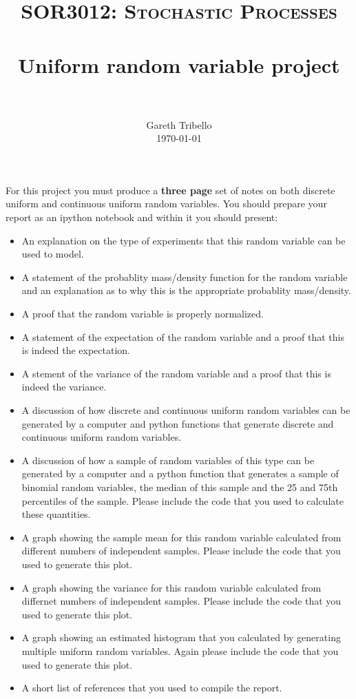 \documentclass[paper=a4, fontsize=11pt]{scrartcl}
\title{\usefont{OT1}{bch}{b}{n} \normalfont \normalsize \textsc{SOR3012:
Stochastic Processes} \\ [25pt] \horrule{0.5pt} \\[0.4cm] 
\huge Uniform random variable project \\
\horrule{2pt} \\[0.25cm]
}
\author{ \normalfont
\normalsize
        Gareth Tribello \\[-3pt] \normalsize
        \today
}
\date{}
\numberwithin{equation}{section}
\numberwithin{figure}{section}
\numberwithin{table}{section}
\begin{document}
\maketitle

For this project you must produce a {\bfseries three page} set of notes on both discrete uniform and continuous uniform random variables.  You should prepare your report as an ipython notebook and within 
it you should present:

\begin{itemize}
 \item An explanation on the type of experiments that this random variable can be used to model. 
 \item A statement of the probablity mass/density function for the random variable and an explanation as to why this is the appropriate probablity mass/density.
 \item A proof that the random variable is properly normalized.
 \item A statement of the expectation of the random variable and a proof that this is indeed the expectation.
 \item A stement of the variance of the random variable and a proof that this is indeed the variance.
 \item A discussion of how discrete and continuous uniform random variables can be generated by a computer and python functions that generate discrete and continuous uniform random variables.
  \item A discussion of how a sample of random variables of this type can be generated by a computer and a python function that generates a sample of binomial random variables, the median of this sample and the 25 and 75th percentiles of the sample.  Please include the code that you used to calculate these quantities.
 \item A graph showing the sample mean for this random variable calculated from different numbers of independent samples.  Please include the code that you used to generate this plot.
 \item A graph showing the variance for this random variable calculated from differnet numbers of independent samples.  Please include the code that you used to generate this plot. 
 \item A graph showing an estimated histogram that you calculated by generating multiple uniform random variables.  Again please include the code that you used to generate this plot.
 \item A short list of references that you used to compile the report.
\end{itemize}
\end{document}
